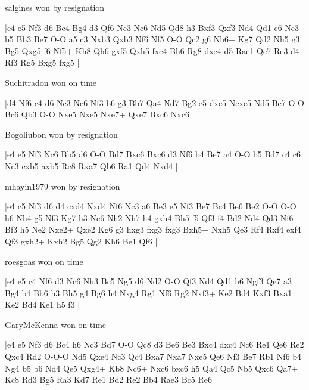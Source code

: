 \showboard

salgines won by resignation

\makegametitle
|e4 e5 Nf3 d6 Bc4 Bg4 d3 Qf6 Nc3 Nc6 Nd5 Qd8 h3 Bxf3 Qxf3 Nd4 Qd1 c6 Ne3 b5 Bb3 Be7 O-O a5 c3 Nxb3 Qxb3 Nf6 Nf5 O-O Qc2 g6 Nh6+ Kg7 Qd2 Nh5 g3 Bg5 Qxg5 f6 Nf5+ Kh8 Qh6 gxf5 Qxh5 fxe4 Bh6 Rg8 dxe4 d5 Rae1 Qe7 Re3 d4 Rf3 Rg5 Bxg5 fxg5  |

\showboard

Suchitradon won on time

\makegametitle
|d4 Nf6 c4 d6 Nc3 Nc6 Nf3 b6 g3 Bb7 Qa4 Nd7 Bg2 e5 dxe5 Ncxe5 Nd5 Be7 O-O Bc6 Qb3 O-O Nxe5 Nxe5 Nxe7+ Qxe7 Bxc6 Nxc6  |

\showboard

Bogoliubon won by resignation

\makegametitle
|e4 e5 Nf3 Nc6 Bb5 d6 O-O Bd7 Bxc6 Bxc6 d3 Nf6 b4 Be7 a4 O-O b5 Bd7 c4 c6 Nc3 cxb5 axb5 Rc8 Rxa7 Qb6 Ra1 Qd4 Nxd4  |

\showboard

mhayin1979 won by resignation

\makegametitle
|e4 c5 Nf3 d6 d4 cxd4 Nxd4 Nf6 Nc3 a6 Be3 e5 Nf3 Be7 Bc4 Be6 Be2 O-O O-O h6 Nh4 g5 Nf3 Kg7 h3 Nc6 Nh2 Nh7 h4 gxh4 Bh5 f5 Qf3 f4 Bd2 Nd4 Qd3 Nf6 Bf3 h5 Ne2 Nxe2+ Qxe2 Kg6 g3 hxg3 fxg3 fxg3 Bxh5+ Nxh5 Qe3 Rf4 Rxf4 exf4 Qf3 gxh2+ Kxh2 Bg5 Qg2 Kh6 Be1 Qf6  |

\showboard

roesgoas won on time

\makegametitle
|e4 e5 c4 Nf6 d3 Nc6 Nh3 Bc5 Ng5 d6 Nd2 O-O Qf3 Nd4 Qd1 h6 Ngf3 Qe7 a3 Bg4 b4 Bb6 h3 Bh5 g4 Bg6 h4 Nxg4 Rg1 Nf6 Rg2 Nxf3+ Ke2 Bd4 Kxf3 Bxa1 Ke2 Bd4 Ke1 h5 f3  |

\showboard

GaryMcKenna won on time

\makegametitle
|e4 e5 Nf3 d6 Bc4 h6 Nc3 Bd7 O-O Qc8 d3 Be6 Be3 Bxc4 dxc4 Nc6 Re1 Qe6 Re2 Qxc4 Rd2 O-O-O Nd5 Qxe4 Nc3 Qc4 Bxa7 Nxa7 Nxe5 Qe6 Nf3 Be7 Rb1 Nf6 b4 Ng4 b5 b6 Nd4 Qe5 Qxg4+ Kb8 Nc6+ Nxc6 bxc6 h5 Qa4 Qc5 Nb5 Qxc6 Qa7+ Kc8 Rd3 Bg5 Ra3 Kd7 Re1 Bd2 Re2 Bb4 Rae3 Bc5 Re6  |

